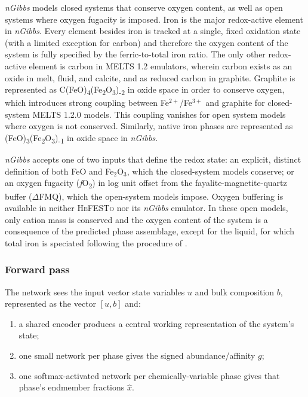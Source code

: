 \emph{nGibbs} models closed systems that conserve oxygen content, as well as open systems where oxygen fugacity is imposed. 
Iron is the major redox-active element in \emph{nGibbs}. Every element besides iron is tracked at a single, 
fixed oxidation state (with a limited exception for carbon) and therefore the oxygen content of the system is fully specified by the ferric-to-total iron ratio. 
The only other redox-active element is carbon in \textsc{MELTS} 1.2 emulators, wherein carbon exists as an oxide in melt, 
fluid, and calcite, and as reduced carbon in graphite. Graphite is represented as C(FeO)\textsubscript{4}(Fe\textsubscript{2}O\textsubscript{3})\textsubscript{-2} in oxide space 
in order to conserve oxygen, which introduces strong coupling between Fe$^{2+}$/Fe$^{3+}$ and graphite for closed-system \textsc{MELTS} 1.2.0 models. This coupling vanishes for 
open system models where oxygen is not conserved. 
Similarly, native iron phases are represented as (FeO)\textsubscript{3}(Fe\textsubscript{2}O\textsubscript{3})\textsubscript{-1} in oxide space in \emph{nGibbs}.

\emph{nGibbs} accepts one of two inputs that define the redox state: an explicit, distinct definition of both 
FeO and Fe$_2$O$_3$, which the closed-system models conserve; or an oxygen fugacity (\emph{f}O\textsubscript{2}) 
in log unit offset from the fayalite-magnetite-quartz buffer ($\Delta$FMQ), which the open-system models impose. 
Oxygen buffering is available in neither \textsc{HeFESTo} nor its \emph{nGibbs} emulator. 
In these open models, only cation mass is conserved and the oxygen content of the system is a consequence 
of the predicted phase assemblage, except for the liquid, for which total iron is speciated following the procedure 
of \citet{kress1991}.

\subsubsection{Forward pass}

The network sees the input vector state variables $u$ and bulk composition $b$, represented as the vector $[u, b]$ and:
\begin{enumerate}[nosep]
  \item a shared encoder produces a central working representation of the system's state;
  \item one small network per phase gives the signed abundance/affinity $g$;
  \item one softmax-activated network per chemically-variable phase gives that phase's endmember fractions $\hat x$.
\end{enumerate}

